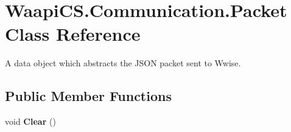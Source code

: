 \hypertarget{class_waapi_c_s_1_1_communication_1_1_packet}{}\section{Waapi\+C\+S.\+Communication.\+Packet Class Reference}
\label{class_waapi_c_s_1_1_communication_1_1_packet}


A data object which abstracts the J\+S\+ON packet sent to Wwise.  


\subsection*{Public Member Functions}
\begin{DoxyCompactItemize}
\item 
\mbox{\label{class_waapi_c_s_1_1_communication_1_1_packet_abd3f7d5e5898edf2d85fd8735f538242}} 
void {\bfseries Clear} ()
\end{DoxyCompactItemize}

